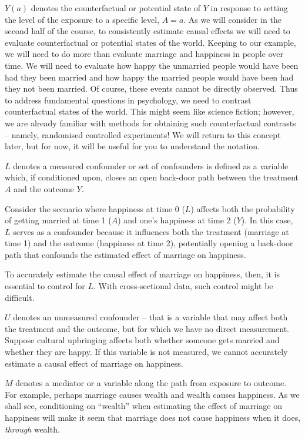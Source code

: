 \documentclass[
  singlecolumn]{article}
\begin{document}
\(Y(a)\) denotes the counterfactual or potential state of \(Y\) in
response to setting the level of the exposure to a specific level,
\(A=a\). As we will consider in the second half of the course, to
consistently estimate causal effects we will need to evaluate
counterfactual or potential states of the world. Keeping to our example,
we will need to do more than evaluate marriage and happiness in people
over time. We will need to evaluate how happy the unmarried people would
have been had they been married and how happy the married people would
have been had they not been married. Of course, these events cannot be
directly observed. Thus to address fundamental questions in psychology,
we need to contrast counterfactual states of the world. This might seem
like science fiction; however, we are already familiar with methods for
obtaining such counterfactual contrasts -- namely, randomised controlled
experiments! We will return to this concept later, but for now, it will
be useful for you to understand the notation.

\(L\) denotes a measured confounder or set of confounders is defined as
a variable which, if conditioned upon, closes an open back-door path
between the treatment \(A\) and the outcome \(Y\).

Consider the scenario where happiness at time 0 (\(L\)) affects both the
probability of getting married at time 1 (\(A\)) and one's happiness at
time 2 (\(Y\)). In this case, \(L\) serves as a confounder because it
influences both the treatment (marriage at time 1) and the outcome
(happiness at time 2), potentially opening a back-door path that
confounds the estimated effect of marriage on happiness.

To accurately estimate the causal effect of marriage on happiness, then,
it is essential to control for \(L\). With cross-sectional data, such
control might be difficult.

\(U\) denotes an unmeasured confounder -- that is a variable that may
affect both the treatment and the outcome, but for which we have no
direct measurement. Suppose cultural upbringing affects both whether
someone gets married and whether they are happy. If this variable is not
measured, we cannot accurately estimate a causal effect of marriage on
happiness.

\(M\) denotes a mediator or a variable along the path from exposure to
outcome. For example, perhaps marriage causes wealth and wealth causes
happiness. As we shall see, conditioning on ``wealth'' when estimating
the effect of marriage on happiness will make it seem that marriage does
not cause happiness when it does, \emph{through} wealth.
\end{document}
